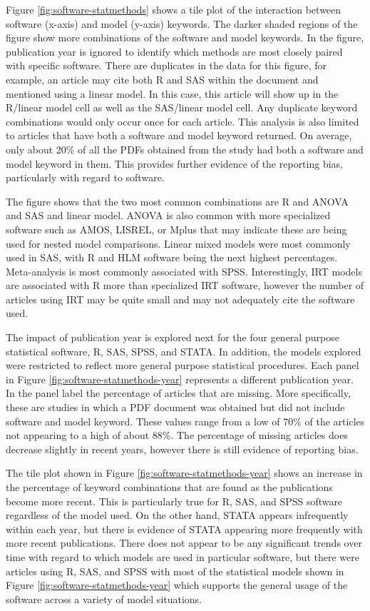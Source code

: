 \documentclass[english,,man]{apa6}
\begin{document}
Figure \ref{fig:software-statmethods} shows a tile plot of the interaction between software (x-axis) and model (y-axis) keywords. The darker shaded regions of the figure show more combinations of the software and model keywords. In the figure, publication year is ignored to identify which methods are most closely paired with specific software. There are duplicates in the data for this figure, for example, an article may cite both R and SAS within the document and mentioned using a linear model. In this case, this article will show up in the R/linear model cell as well as the SAS/linear model cell. Any duplicate keyword combinations would only occur once for each article. This analysis is also limited to articles that have both a software and model keyword returned. On average, only about 20\% of all the PDFs obtained from the study had both a software and model keyword in them. This provides further evidence of the reporting bias, particularly with regard to software.

The figure shows that the two most common combinations are R and ANOVA and SAS and linear model. ANOVA is also common with more specialized software such as AMOS, LISREL, or Mplus that may indicate these are being used for nested model comparisons. Linear mixed models were most commonly used in SAS, with R and HLM software being the next highest percentages. Meta-analysis is most commonly associated with SPSS. Interestingly, IRT models are associated with R more than specialized IRT software, however the number of articles using IRT may be quite small and may not adequately cite the software used.

The impact of publication year is explored next for the four general purpose statistical software, R, SAS, SPSS, and STATA. In addition, the models explored were restricted to reflect more general purpose statistical procedures. Each panel in Figure \ref{fig:software-statmethods-year} represents a different publication year. In the panel label the percentage of articles that are missing. More specifically, these are studies in which a PDF document was obtained but did not include software and model keyword. These values range from a low of 70\% of the articles not appearing to a high of about 88\%. The percentage of missing articles does decrease slightly in recent years, however there is still evidence of reporting bias.

The tile plot shown in Figure \ref{fig:software-statmethods-year} shows an increase in the percentage of keyword combinations that are found as the publications become more recent. This is particularly true for R, SAS, and SPSS software regardless of the model used. On the other hand, STATA appears infrequently within each year, but there is evidence of STATA appearing more frequently with more recent publications. There does not appear to be any significant trends over time with regard to which models are used in particular software, but there were articles using R, SAS, and SPSS with most of the statistical models shown in Figure \ref{fig:software-statmethods-year} which supports the general usage of the software across a variety of model situations.
\end{document}
